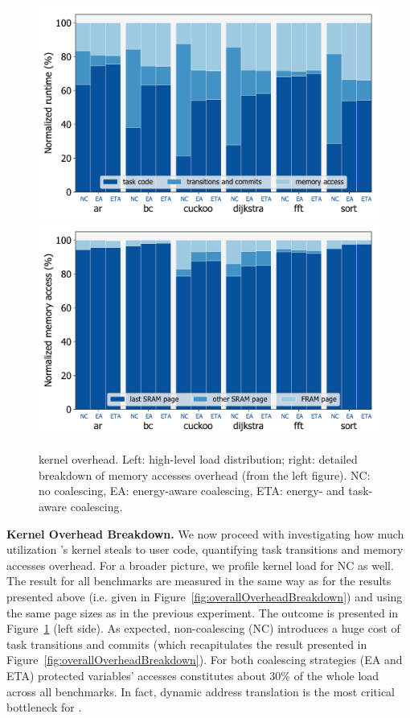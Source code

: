 \begin{figure}
	\centering
	\includegraphics[width=0.49\columnwidth]{figures/overallOverhead}
	\includegraphics[width=0.49\columnwidth]{figures/memAccess}
	\caption{\sys kernel overhead. Left: high-level load distribution; right: detailed breakdown of memory accesses overhead (from the left figure). NC: no coalescing, EA: energy-aware coalescing, ETA: energy- and task-aware coalescing. }
	\label{fig:coalEfficiency}
\end{figure}

\textbf{\sys Kernel Overhead Breakdown.} We now proceed with investigating how much utilization \sys's kernel steals to user code, quantifying task transitions and memory accesses overhead. For a broader picture, we profile kernel load for NC as well. The result for all benchmarks are measured in the same way as for the results presented above (i.e. given in Figure~\ref{fig:overallOverheadBreakdown}) and using the same page sizes as in the previous experiment. The outcome is presented in Figure~\ref{fig:coalEfficiency} (left side).
%
As expected, non-coalescing (NC) \sys introduces a huge cost of task transitions and commits (which recapitulates the result presented in Figure~\ref{fig:overallOverheadBreakdown}). For both coalescing strategies (EA and ETA) protected variables' accesses constitutes about 30\% of the whole load across all benchmarks. In fact, dynamic address translation is the most critical bottleneck for \sys.

